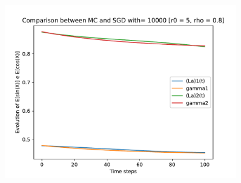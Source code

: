 \documentclass[a4paper,11pt,openright]{report}
\begin{document}
\begin{figure}[H]
\centering
\includegraphics[width=0.9\textwidth]{images/graphics T = 1/n = 3, M = 10000 sine and cosine.pdf}
\end{figure}
\newpage
\end{document}
